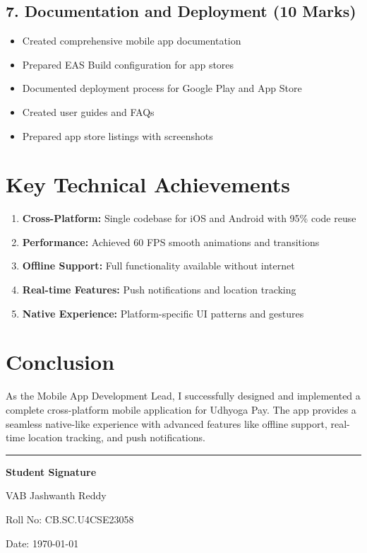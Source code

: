 \documentclass[12pt,a4paper]{article}
\begin{document}
\subsection*{7. Documentation and Deployment (10 Marks)}
\begin{itemize}[leftmargin=*]
    \item Created comprehensive mobile app documentation
    \item Prepared EAS Build configuration for app stores
    \item Documented deployment process for Google Play and App Store
    \item Created user guides and FAQs
    \item Prepared app store listings with screenshots
\end{itemize}

\section*{Key Technical Achievements}

\begin{enumerate}[leftmargin=*]
    \item \textbf{Cross-Platform:} Single codebase for iOS and Android with 95\% code reuse
    \item \textbf{Performance:} Achieved 60 FPS smooth animations and transitions
    \item \textbf{Offline Support:} Full functionality available without internet
    \item \textbf{Real-time Features:} Push notifications and location tracking
    \item \textbf{Native Experience:} Platform-specific UI patterns and gestures
\end{enumerate}

\section*{Conclusion}

As the Mobile App Development Lead, I successfully designed and implemented a complete cross-platform mobile application for Udhyoga Pay. The app provides a seamless native-like experience with advanced features like offline support, real-time location tracking, and push notifications.

\vspace{1cm}

\begin{center}
\rule{0.5\textwidth}{0.4pt}

\vspace{0.5cm}

\textbf{Student Signature}

\vspace{0.3cm}

VAB Jashwanth Reddy

Roll No: CB.SC.U4CSE23058

\vspace{0.5cm}

Date: \today
\end{center}
\end{document}
